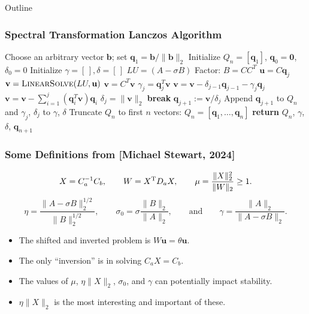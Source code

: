 \documentclass[landscape]{beamer}
\newcommand{\eqand}{\qquad\mbox{and}\qquad}
\renewcommand{\vec}[1]{\bm{#1}}
\newcommand{\T}{{\rm T}}
\begin{document}
\begin{frame}[allowframebreaks]{Outline}
	\frametitle{Spectral Transformation Lanczos Algorithm}
	
	\begin{algorithmic}[1]
		\State Choose an arbitrary vector $\mathbf{b}$; set $\mathbf{q}_1 = \mathbf{b}/ \|\mathbf{b}\|_2$
		\State Initialize $Q_n = [\mathbf{q}_1]$, $\mathbf{q}_0 = \mathbf{0}$, $\delta_0 = 0$
		\State Initialize $\gamma = [\,], \delta = [\,]$ 
		\State $LU = (A - \sigma B)$ 
		\State Factor: $B = CC^T$ 
		\State $\mathbf{u} = C\mathbf{q}_j$ 
		\State $\mathbf{v} = \textsc{LinearSolve}(LU, \mathbf{u})$ 
		\State $\mathbf{v} = C^T \mathbf{v}$ 
		\State $\gamma_j = \mathbf{q}_j^T \mathbf{v} $ 
		\State $\mathbf{v} = \mathbf{v} - \delta_{j-1}\mathbf{q}_{j-1} - \gamma_j \mathbf{q}_j$ 
		\State $\mathbf{v} = \mathbf{v} - \sum_{i=1}^j (\mathbf{q}_i^T \mathbf{v})\mathbf{q}_i$ 
		\State $\delta_{j} = \|\mathbf{v}\|_2$ 
		\State \textbf{break}
		\EndIf
		\State $\mathbf{q}_{j+1} := \mathbf{v} / \delta_{j}$
		\State Append $\mathbf{q}_{j+1}$ to $Q_n$ and $\gamma_j$, $\delta_{j}$ to $\gamma$, $\delta$
		\EndFor
		\State Truncate $Q_n$ to first $n$ vectors: $Q_n = [\mathbf{q}_1, \dots, \mathbf{q}_n]$
		\State \textbf{return} $Q_n$, $\gamma$, $\delta$, $\mathbf{q}_{n+1}$
		\EndFunction
	\end{algorithmic}
\end{frame}

\begin{frame}
  \frametitle{Some Definitions from [Michael Stewart, 2024]}

  \begin{equation*}
    X = C_a^{-1} C_b,  \qquad W = X^\T D_a X, \qquad
    \mu = \frac{\|X\|_2^2}{\|W\|_2} \geq 1.
  \end{equation*}
  \begin{equation*}
    \eta = \frac{\|A-\sigma B\|_2^{1/2}}{\|B\|_2^{1/2}},\qquad \sigma_0 = \sigma \frac{\|B\|_2}{\|A\|_2},
    \eqand \gamma = \frac{\|A\|_2}{\|A-\sigma B\|_2}.
  \end{equation*}
  
  \begin{itemize}
  \item The shifted and inverted problem is $W \vec{u} = \theta \vec{u}$.
  \item The only ``inversion'' is in solving $C_a X = C_b$.
  \item The values of $\mu$, $\eta \|X\|_2$, $\sigma_0$, and $\gamma$
    can potentially impact stability.
  \item $\eta \|X\|_2$ is the most interesting and important of these.
  \end{itemize}
\end{frame}
\end{document}
